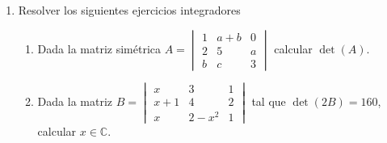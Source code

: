 \documentclass[a4paper]{article}
\newcommand{\exercise}{\item}
\begin{document}
\begin{enumerate}
\begin{enumerate} [label=(\alph*)]
		\item $\det(A^{-1})$
		\item $\det\left((A.B)^T\right)$ 
		\item $\det(A+B)$
		\item $\det(2.A^4)$ 
		\item $\det(-k.B^n)$ con $k\in\mathbb{R}$ y $n\in\mathbb{N}$. 
		\item $\det\left((A^T.B^{-1})^2\right)$
	\end{enumerate}
	\exercise Resolver los siguientes ejercicios integradores
	\begin{enumerate} [label=(\alph*)]
		\item Dada la matriz simétrica $A=\begin{vmatrix} 1 & a+b & 0 \\ 2 & 5 & a \\ b & c & 3\end{vmatrix}$ calcular $\det(A)$.
		\item Dada la matriz $B=\begin{vmatrix} x & 3 & 1 \\ x+1 & 4 & 2 \\ x & 2-x^2 & 1\end{vmatrix}$ tal que $\det(2B)=160$, calcular $x\in\mathbb{C}$.
	\end{enumerate}
\end{enumerate}
\vspace{20pt} 
\end{document}
